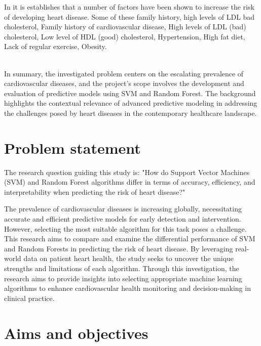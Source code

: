In \cite{yanwei2007combination}it is establishes that a number of factors have been
shown to increase the risk of developing heart disease. Some
of these family history, high levels of LDL bad cholesterol,
Family history of cardiovascular disease, High levels of LDL
(bad) cholesterol, Low level of HDL (good) cholesterol,
Hypertension, High fat diet, Lack of regular exercise,
Obesity.

\\



In summary, the investigated problem centers on the escalating prevalence of cardiovascular diseases, and the project's scope involves the development and evaluation of predictive models using SVM and Random Forest. The background highlights the contextual relevance of advanced predictive modeling in addressing the challenges posed by heart diseases in the contemporary healthcare landscape.


\section{Problem statement}
\label{sec:intro_prob_art}

The research question guiding this study is: "How do Support Vector Machines (SVM) and Random Forest algorithms differ in terms of accuracy, efficiency, and interpretability when predicting the risk of heart disease?"

The prevalence of cardiovascular diseases is increasing globally, necessitating accurate and efficient predictive models for early detection and intervention. However, selecting the most suitable algorithm for this task poses a challenge. This research aims to compare and examine the differential performance of SVM and Random Forests in predicting the risk of heart disease. By leveraging real-world data\cite{lapp-heart-disease-dataset-1988} on patient heart health, the study seeks to uncover the unique strengths and limitations of each algorithm. Through this investigation, the research aims to provide insights into selecting appropriate machine learning algorithms to enhance cardiovascular health monitoring and decision-making in clinical practice.



\section{Aims and objectives}
\label{sec:intro_aims_obj}




